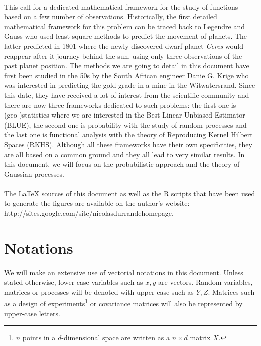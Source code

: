 \documentclass[twoside,openright]{report}
\begin{document}
\paragraph{}
This call for a dedicated mathematical framework for the study of functions based on a few number of observations. Historically, the first detailed mathematical framework for this problem can be traced back to Legendre and Gauss who used least square methods to predict the movement of planets. The latter predicted in 1801 where the newly discovered dwarf planet \emph{Ceres} would reappear after it journey behind the sun, using only three observations of the past planet position. The methods we are going to detail in this document have first been studied in the 50s by the South African engineer Danie G. Krige who was interested in predicting the gold grade in a mine in the Witwatersrand. Since this date, they have received a lot of interest from the scientific community and there are now three frameworks dedicated to such problems: the first one is (geo-)statistics where we are interested in the Best Linear Unbiased Estimator (BLUE), the second one is probability with the study of random processes and the last one is functional analysis with the theory of Reproducing Kernel Hilbert Spaces (RKHS). Although all these frameworks have their own specificities, they are all based on a common ground and they all lead to very similar results. In this document, we will focus on the probabilistic approach and the theory of Gaussian processes.

\paragraph{}
The LaTeX sources of this document as well as the R scripts that have been used to generate the figures are available on the author's website: http://sites.google.com/site/nicolasdurrandehomepage.

\section*{Notations}
\paragraph{}
We will make an extensive use of vectorial notations in this document. Unless stated otherwise, lower-case variables such as $x,y$ are vectors. Random variables, matrices or processes will be denoted with upper-case such as $Y,Z$. Matrices such as a design of experiments\footnote{$n$ points in a $d$-dimensional space are written as a $n \times d$ matrix $X$.} or covariance matrices will also be represented by upper-case letters.
\end{document}
